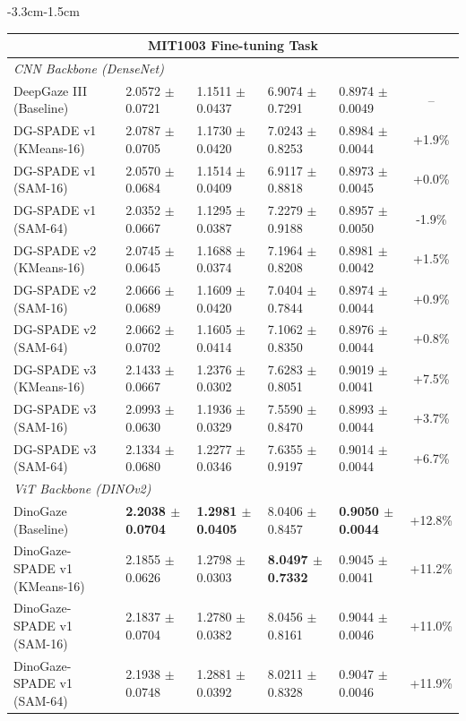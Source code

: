 \begin{table}[p!]
\begin{adjustwidth}{-3.3cm}{-1.5cm}
{\begin{tabular}{@{}l l l l l c@{}}
    \multicolumn{6}{c}{\textbf{MIT1003 Fine-tuning Task}} \\
    \midrule
    \multicolumn{6}{l}{\textit{CNN Backbone (DenseNet)}} \\
    DeepGaze III (Baseline) & 2.0572 $\pm$ 0.0721 & 1.1511 $\pm$ 0.0437 & 6.9074 $\pm$ 0.7291 & 0.8974 $\pm$ 0.0049 & -- \\
    DG-SPADE v1 (KMeans-16) & 2.0787 $\pm$ 0.0705 & 1.1730 $\pm$ 0.0420 & 7.0243 $\pm$ 0.8253 & 0.8984 $\pm$ 0.0044 & +1.9\% \\
    DG-SPADE v1 (SAM-16) & 2.0570 $\pm$ 0.0684 & 1.1514 $\pm$ 0.0409 & 6.9117 $\pm$ 0.8818 & 0.8973 $\pm$ 0.0045 & +0.0\% \\
    DG-SPADE v1 (SAM-64) & 2.0352 $\pm$ 0.0667 & 1.1295 $\pm$ 0.0387 & 7.2279 $\pm$ 0.9188 & 0.8957 $\pm$ 0.0050 & -1.9\% \\
    DG-SPADE v2 (KMeans-16) & 2.0745 $\pm$ 0.0645 & 1.1688 $\pm$ 0.0374 & 7.1964 $\pm$ 0.8208 & 0.8981 $\pm$ 0.0042 & +1.5\% \\
    DG-SPADE v2 (SAM-16) & 2.0666 $\pm$ 0.0689 & 1.1609 $\pm$ 0.0420 & 7.0404 $\pm$ 0.7844 & 0.8974 $\pm$ 0.0044 & +0.9\% \\
    DG-SPADE v2 (SAM-64) & 2.0662 $\pm$ 0.0702 & 1.1605 $\pm$ 0.0414 & 7.1062 $\pm$ 0.8350 & 0.8976 $\pm$ 0.0044 & +0.8\% \\
    DG-SPADE v3 (KMeans-16) & 2.1433 $\pm$ 0.0667 & 1.2376 $\pm$ 0.0302 & 7.6283 $\pm$ 0.8051 & 0.9019 $\pm$ 0.0041 & +7.5\% \\
    DG-SPADE v3 (SAM-16) & 2.0993 $\pm$ 0.0630 & 1.1936 $\pm$ 0.0329 & 7.5590 $\pm$ 0.8470 & 0.8993 $\pm$ 0.0044 & +3.7\% \\
    DG-SPADE v3 (SAM-64) & 2.1334 $\pm$ 0.0680 & 1.2277 $\pm$ 0.0346 & 7.6355 $\pm$ 0.9197 & 0.9014 $\pm$ 0.0044 & +6.7\% \\
    \midrule
    \multicolumn{6}{l}{\textit{ViT Backbone (DINOv2)}} \\
    DinoGaze (Baseline) & \bfseries 2.2038 $\pm$ 0.0704 & \bfseries 1.2981 $\pm$ 0.0405 & 8.0406 $\pm$ 0.8457 & \bfseries 0.9050 $\pm$ 0.0044 & +12.8\% \\
    DinoGaze-SPADE v1 (KMeans-16) & 2.1855 $\pm$ 0.0626 & 1.2798 $\pm$ 0.0303 & \bfseries 8.0497 $\pm$ 0.7332 & 0.9045 $\pm$ 0.0041 & +11.2\% \\
    DinoGaze-SPADE v1 (SAM-16) & 2.1837 $\pm$ 0.0704 & 1.2780 $\pm$ 0.0382 & 8.0456 $\pm$ 0.8161 & 0.9044 $\pm$ 0.0046 & +11.0\% \\
    DinoGaze-SPADE v1 (SAM-64) & 2.1938 $\pm$ 0.0748 & 1.2881 $\pm$ 0.0392 & 8.0211 $\pm$ 0.8328 & 0.9047 $\pm$ 0.0046 & +11.9\% \\
    \bottomrule
\end{tabular}
\par\medskip
} %
\end{adjustwidth}
\end{table}

